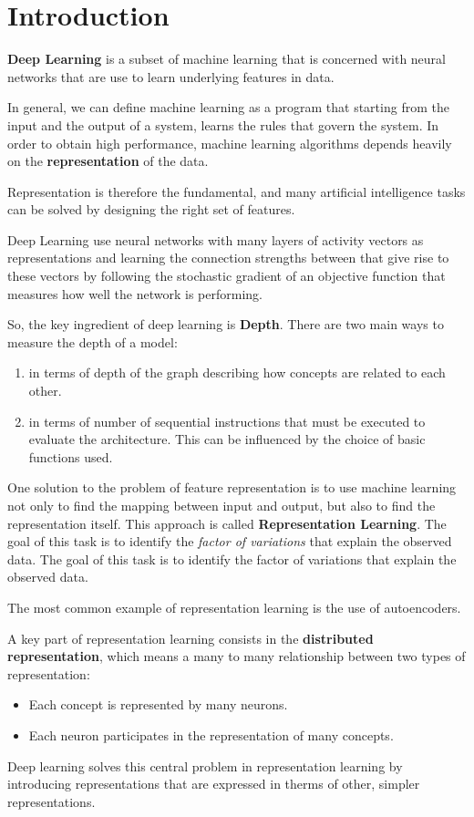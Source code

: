 \chapter*{Introduction}
\textbf{Deep Learning} is a subset of machine learning that is concerned with 
neural networks that are use to learn underlying features in data.

In general, we can define machine learning as a program that starting from the 
input and the output of a system, learns the rules that govern the system. In 
order to obtain high performance, machine learning algorithms depends heavily on 
the \textbf{representation} of the data.

Representation is therefore the fundamental, and many artificial intelligence 
tasks can be solved by designing the right set of features.

Deep Learning use neural networks with many layers of activity vectors as 
representations and learning the connection strengths between that give rise to 
these vectors by following the stochastic gradient of an objective function that
measures how well the network is performing.

So, the key ingredient of deep learning is \textbf{Depth}. There are two main 
ways to measure the depth of a model:
\begin{enumerate}
    \item in terms of depth of the graph describing how concepts are related to
        each other.
    \item in terms of number of sequential instructions that must be executed to 
        evaluate the architecture. This can be influenced by the choice of basic 
        functions used.
\end{enumerate}

One solution to the problem of feature representation is to use machine learning
not only to find the mapping between input and output, but also to find the
representation itself. This approach is called \textbf{Representation Learning}.
The goal of this task is to identify the \textit{factor of variations} that 
explain the observed data. The goal of this task is to identify the factor of 
variations that explain the observed data.

The most common example of representation learning is the use of autoencoders.

A key part of representation learning consists in the \textbf{distributed 
    representation}, which means a many to many relationship between two types
of representation:
\begin{itemize}
    \item Each concept is represented by many neurons.
    \item Each neuron participates in the representation of many concepts.
\end{itemize}

Deep learning solves this central problem in representation learning by introducing
representations that are expressed in therms of other, simpler representations.

